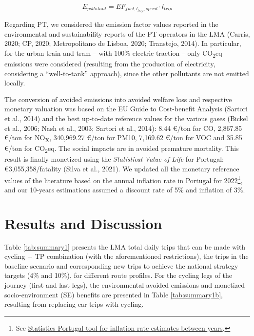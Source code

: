 \documentclass[review, doubleblind, 3p,
authoryear]{elsarticle} %
\begin{document}
\begin{equation}\label{eq:emissaoauto}
{E}_{pollutant} = {EF}_{fuel,l_{trip},speed}\cdot l_{trip}
\end{equation}

Regarding PT, we considered the emission factor values reported in the
environmental and sustainability reports of the PT operators in the LMA
(Carris, 2020; CP, 2020; Metropolitano de Lisboa, 2020; Transtejo,
2014). In particular, for the urban train and tram -- with 100\%
electric traction -- only CO\textsubscript{2}eq emissions were
considered (resulting from the production of electricity, considering a
``well-to-tank'' approach), since the other pollutants are not emitted
locally.

The conversion of avoided emissions into avoided welfare loss and
respective monetary valuation was based on the EU Guide to Cost-benefit
Analysis (Sartori et al., 2014) and the best up-to-date reference values
for the various gases (Bickel et al., 2006; Nash et al., 2003; Sartori
et al., 2014): 8.44 €/ton for CO, 2,867.85 €/ton for
NO\textsubscript{X}, 340,969.27 €/ton for PM10, 7,169.62 €/ton for VOC
and 35.85 €/ton for CO\textsubscript{2}eq. The social impacts are in
avoided premature mortality. This result is finally monetized using the
\emph{Statistical Value of Life} for Portugal: €3,055,358/fatality
(Silva et al., 2021). We updated all the monetary reference values of
the literature based on the annual inflation rate in Portugal for
2022\footnote{See
  \href{https://www.ine.pt/xportal/xmain?xpid=INE\&xpgid=ipc}{Statistics
  Portugal tool for inflation rate estimates between years}.}, and our
10-years estimations assumed a discount rate of 5\% and inflation of
3\%.

\hypertarget{results-and-discussion}{%
\section{Results and Discussion}\label{results-and-discussion}}

Table \ref{tab:summary1} presents the LMA total daily trips that can be
made with cycling + TP combination (with the aforementioned
restrictions), the trips in the baseline scenario and corresponding new
trips to achieve the national strategy targets (4\% and 10\%), for
different route profiles. For the cycling legs of the journey (first and
last legs), the environmental avoided emissions and monetized
socio-environment (SE) benefits are presented in Table
\ref{tab:summary1b}, resulting from replacing car trips with cycling.
\end{document}
